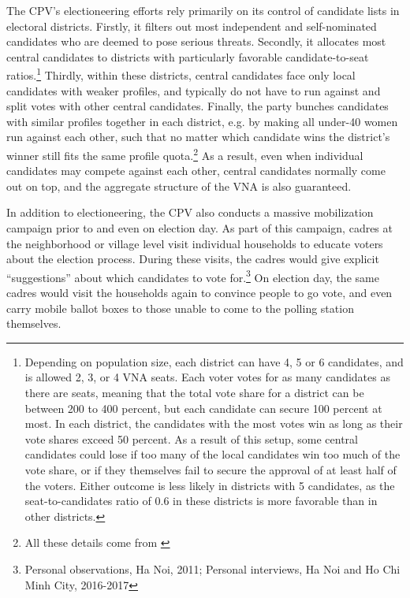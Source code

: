 \documentclass[12pt]{article}
\newcommand\fnote[1]{\footnote{\baselineskip=2\normalbaselineskip#1}}
\newcommand{\1}{\mathbbm{1}}
\begin{document}
The CPV's electioneering efforts rely primarily on its control of candidate lists in electoral districts. Firstly, it filters out most independent and self-nominated candidates who are deemed to pose serious threats. Secondly, it allocates most central candidates to districts with particularly favorable candidate-to-seat ratios.\fnote{Depending on population size, each district can have 4, 5 or 6 candidates, and is allowed 2, 3, or 4 VNA seats. Each voter votes for as many candidates as there are seats, meaning that the total vote share for a district can be between 200 to 400 percent, but each candidate can secure 100 percent at most. In each district, the candidates with the most votes win as long as their vote shares exceed 50 percent. As a result of this setup, some central candidates could lose if too many of the local candidates win too much of the vote share, or if they themselves fail to secure the approval of at least half of the voters. Either outcome is less likely in districts with 5 candidates, as the seat-to-candidates ratio of $0.6$ in these districts is more favorable than in other districts.} Thirdly, within these districts, central candidates face only local candidates with weaker profiles, and typically do not have to run against and split votes with other central candidates. Finally, the party bunches candidates with similar profiles together in each district, e.g. by making all under-40 women run against each other, such that no matter which candidate wins the district's winner still fits the same profile quota.\fnote{All these details come from \citet{MaleskySchuler2011}} As a result, even when individual candidates may compete against each other, central candidates normally come out on top, and the aggregate structure of the VNA is also guaranteed. 

In addition to electioneering, the CPV also conducts a massive mobilization campaign prior to and even on election day. As part of this campaign, cadres at the neighborhood or village level visit individual households to educate voters about the election process. During these visits, the cadres would give explicit ``suggestions'' about which candidates to vote for.\fnote{Personal observations, Ha Noi, 2011; Personal interviews, Ha Noi and Ho Chi Minh City, 2016-2017} On election day, the same cadres would visit the households again to convince people to go vote, and even carry mobile ballot boxes to those unable to come to the polling station themselves.
\end{document}

